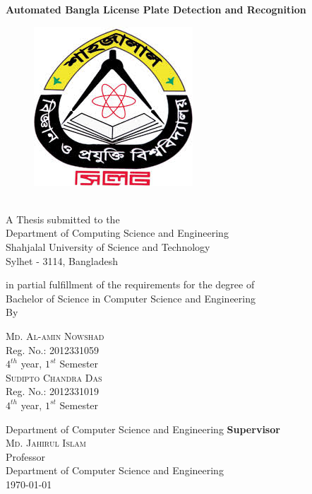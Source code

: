\vspace{0.5cm}
{\Large \bf Automated Bangla License Plate Detection and Recognition}
\begin{figure}[h]
\centering
\includegraphics[scale=0.6]{./img/varsityLogo}
\end{figure}\\

\vspace{0.5cm}
A Thesis submitted to the \\
{\large Department of Computing Science and Engineering}\\
{\Large Shahjalal University of Science and Technology}\\
Sylhet - 3114, Bangladesh

in partial fulfillment of the requirements for the degree of \\
    
{\Large Bachelor of Science in Computer Science and Engineering}\\

\vfill {\LARGE By}\\
\begin{multicols}{2}
\textsc{\Large Md. Al-amin Nowshad }\\
Reg. No.: 2012331059\\ $4^{th}$ year, $1^{st}$ Semester\\
\textsc{\Large Sudipto Chandra Das} \\
Reg. No.: 2012331019\\ $4^{th}$ year, $1^{st}$ Semester\\ 
\end{multicols}

\vfill Department of Computer Science and Engineering
\vfill
{\bf Supervisor}\\
\textsc{\Large Md. Jahirul Islam} \\
Professor\\ 
Department of Computer Science and Engineering\\

\vfill
\today